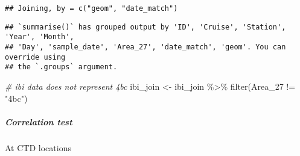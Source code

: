 \documentclass[
]{article}
\newenvironment{Shaded}{\begin{snugshade}}{\end{snugshade}}
\newcommand{\AttributeTok}[1]{\textcolor[rgb]{0.77,0.63,0.00}{#1}}
\newcommand{\CommentTok}[1]{\textcolor[rgb]{0.56,0.35,0.01}{\textit{#1}}}
\newcommand{\FunctionTok}[1]{\textcolor[rgb]{0.00,0.00,0.00}{#1}}
\newcommand{\NormalTok}[1]{#1}
\newcommand{\OtherTok}[1]{\textcolor[rgb]{0.56,0.35,0.01}{#1}}
\newcommand{\SpecialCharTok}[1]{\textcolor[rgb]{0.00,0.00,0.00}{#1}}
\newcommand{\StringTok}[1]{\textcolor[rgb]{0.31,0.60,0.02}{#1}}
\begin{document}
\begin{verbatim}
## Joining, by = c("geom", "date_match")
\end{verbatim}

\begin{Shaded}
\end{Shaded}

\begin{verbatim}
## `summarise()` has grouped output by 'ID', 'Cruise', 'Station', 'Year', 'Month',
## 'Day', 'sample_date', 'Area_27', 'date_match', 'geom'. You can override using
## the `.groups` argument.
\end{verbatim}

\begin{Shaded}
\begin{Highlighting}[]
\CommentTok{\# ibi data does not represent 4bc}
\NormalTok{ibi\_join }\OtherTok{\textless{}{-}}\NormalTok{ ibi\_join }\SpecialCharTok{\%\textgreater{}\%} \FunctionTok{filter}\NormalTok{(Area\_27 }\SpecialCharTok{!=} \StringTok{"4bc"}\NormalTok{)}
\end{Highlighting}
\end{Shaded}

\hypertarget{correlation-test-3}{%
\subparagraph{Correlation test}\label{correlation-test-3}}

At CTD locations

\begin{Shaded}
\end{Shaded}
\end{document}
